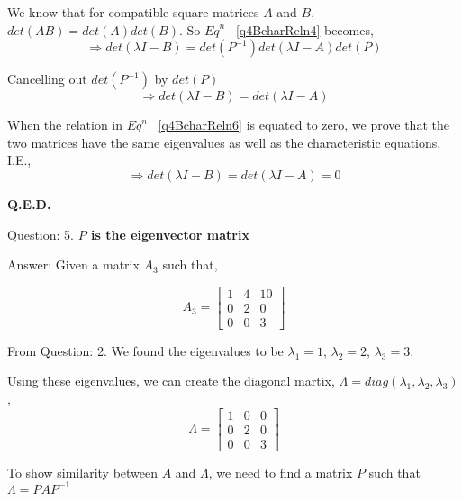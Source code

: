 \documentclass[a4paper]{article}
\begin{document}
\begin{qalist}
			We know that for compatible square matrices $A$ and $B$, $det(AB) = det(A)det(B)$. So ${Eq}^{n}$ ~\ref{q4BcharReln4} becomes, 
			\begin{equation}\label{q4BcharReln5}
				\Rightarrow  det(\lambda I - B) =  det({P}^{-1}) det(\lambda I - A) det(P) 
			\end{equation}
			
			Cancelling out $ det({P}^{-1})$ by $det(P)$
			\begin{equation}\label{q4BcharReln6}
				\Rightarrow  det(\lambda I - B) =  det(\lambda I - A)
			\end{equation}
			
			When the relation in ${Eq}^{n}$ ~\ref{q4BcharReln6} is equated to zero, we prove that the two matrices have the same eigenvalues as well as the characteristic equations. I.E.,
			\begin{equation}\label{q4BcharReln6}
				\Rightarrow  det(\lambda I - B) =  det(\lambda I - A) = 0
			\end{equation}
			
			\textbf{Q.E.D.}

		\item[Question: 5.] \setcounter{equation}{0} \textbf{$P$ is the eigenvector matrix}
		\item[Answer:] Given a matrix ${A}_{3}$ such that,
		
			\begin{equation} \label{q5Given}
				{A}_{3} = \begin{bmatrix}1 & 4 & 10 \\ 0 & 2 & 0 \\ 0 & 0 & 3\end{bmatrix}
			\end{equation}
			
			From Question: 2. We found the eigenvalues to be ${\lambda}_{1} = 1$, ${\lambda}_{2} = 2$, ${\lambda}_{3} = 3$. 
			
			Using these eigenvalues, we can create the diagonal martix, $\Lambda = diag({\lambda}_{1}, {\lambda}_{2}, {\lambda}_{3})$,
			\begin{equation}\label{q5DiagMat}
				\Lambda = \begin{bmatrix}1 & 0 & 0 \\ 0 & 2 & 0 \\ 0 & 0 & 3\end{bmatrix}
			\end{equation}
			
			To show similarity between $A$ and $\Lambda$, we need to find a matrix $P$ such that $\Lambda = P A {P}^{-1}$
			

\end{qalist}
\end{document}
